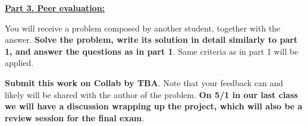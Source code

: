 \documentclass[oneside,11pt]{amsart}
\newcommand{\razdel}[1]{\smallskip\underline{\textbf{#1:}}\smallskip}
\begin{document}
\razdel{Part 3. Peer evaluation}

You will receive a problem composed by another student, together with the answer. 
\textbf{Solve the problem, write its solution in detail similarly to part 1,
and answer the questions as in part 1}. Same criteria as in part 1 will be applied.

\textbf{Submit this work on Collab by TBA}. Note that your feedback can and likely will be shared
with the author of the problem.
\textbf{On 5/1 in our last class we will have a discussion
wrapping up the project, which will also be a 
review session for the final exam}.

\end{document}
